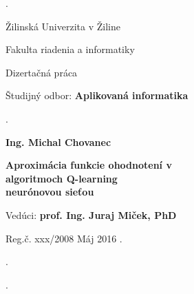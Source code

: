 \begin{titlepage}
\phantom.

\bigskip

\begin{center}
{\sc\LARGE Žilinská Univerzita v Žiline}
\medskip

{\sc\Large Fakulta riadenia a informatiky}

\vfill\vfill\vfill\vfill

{\sc\LARGE Dizertačná práca}

\medskip

{\large Študijný odbor: {\bf Aplikovaná informatika}}
\end{center}


\vfill\vfill\vfill\vfill


\phantom.\hfill
\begin{minipage}{10cm}
\begin{center}
{\large\bf Ing. Michal Chovanec}

\medskip

{\large\bf
  Aproximácia funkcie ohodnotení v \\
  algoritmoch Q-learning \\
  neurónovou sieťou
}

\medskip

Vedúci: {\bf prof. Ing. Juraj Miček, PhD}

\medskip

\hfill
Reg.č. xxx/2008
\hfill
Máj 2016
\hfill\phantom.
\end{center}
\end{minipage}
\hspace{1.7cm}\phantom.

\vspace{2.9cm}

\phantom.
\end{titlepage}



\begin{abstract}

\noindent
{\sc Michal Chovanec:} {\em   Aproximácia funkcie ohodnotení v algoritmoch Q-learning neurónovou sieťou}
[Dizertačná práca]

\noindent
Žilinská Univerzita v~Žiline,
Fakulta riadenia a informatiky,
Katedra technickej kybernetiky.

\noindent
Vedúci: prof. Ing. Juraj Miček, PhD

\noindent
FRI ŽU v~Žiline, 2016

\bigskip

Práca sa zoaberá aproximáciou funkcie ohodnotení konania agenta, využitím
algoritmu Q-learning. V priestoroch s malým počtom stavov predstavuje vhodné riešenie tabuľka.
Pre prípady veľkého počtu stavov je tabuľkové riešenie ťažko vypočítateĺné. Je tak nutné použiť
aproximáciu. Vhodným kandidátom je neurónová sieť. Tradičné riešenie doprednej
siete je však nepoužiteľné z dôvodov nemožnosti takúto sieť učiť. V práci
je preto venovaný priestor neurónovej sieti bázických funkcií ktorú už je možné
na daný problém trénovať iteračnými metódami.

\end{abstract}


